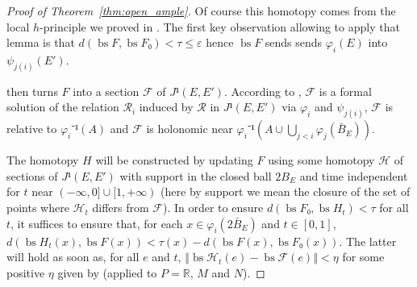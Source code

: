 \documentclass[10pt,a4paper]{article}
\newcommand{\Rel}{\mathcal{R}} %
\newcommand{\F}{\mathcal{F}} %
\newcommand{\HH}{\mathcal{H}} %
\DeclareMathOperator{\bs}{bs} %
\begin{document}
\begin{proof}[Proof of Theorem~\ref{thm:open_ample}]
  Of course this homotopy comes from the local $h$-principle we proved in
  . The first key observation allowing to
  apply that lemma is that $d(\bs F, \bs F₀) < τ ≤ ε$ hence $\bs F$ sends
  sends $φ_i(E)$ into $ψ_{j(i)}(E')$.

   then turns $F$ into a section $\F$ of $J¹(E, E')$.
  According to , $\F$ is a formal solution of
  the relation $\Rel_i$ induced by $\Rel$ in $J¹(E, E')$ via $φ_i$ and
  $ψ_{j(i)}$, $\F$ is relative to $φ_i⁻¹(A)$
  and $\F$ is holonomic near $φ_i⁻¹(A ∪ \bigcup_{j < i} φ_j(\bar B_E))$.

  The homotopy $H$ will be constructed by updating $F$ using some
  homotopy $\HH$ of sections of $J¹(E, E')$ with support in the closed ball $2B_E$
  and time independent for $t$ near $(-∞, 0] ∪ [1, +∞)$ (here by support we mean
  the closure of the set of points where $\HH_t$ differs from $\F$).
  In order to ensure
  $d(\bs F₀, \bs H_t) < τ$ for all $t$, it suffices to ensure that, for each
  $x ∈ φ_i(2\bar{B}_E)$ and $t ∈ [0, 1]$,
  $d(\bs H_t(x), \bs F(x)) < τ(x) - d(\bs F(x), \bs F₀(x))$.
  The latter will hold as soon as, for all $e$ and $t$,
  $‖\bs \HH_t(e) - \bs \F(e)‖ < η$ for some positive $η$ given by
   (applied to $P = ℝ$, $M$ and $N$).
\end{proof}
\end{document}
